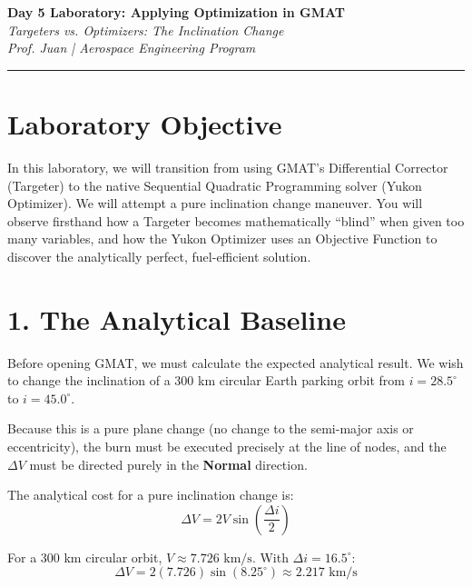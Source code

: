 \documentclass[11pt, letterpaper]{article}
\begin{document}
\begin{center}
    {\Large \textbf{Day 5 Laboratory: Applying Optimization in GMAT}} \\
    \vspace{0.2cm}
    {\large \textit{Targeters vs. Optimizers: The Inclination Change}} \\
    \vspace{0.4cm}
    \textit{Prof. Juan | Aerospace Engineering Program}
\end{center}
\hrule
\vspace{0.5cm}

\section*{Laboratory Objective}
In this laboratory, we will transition from using GMAT's Differential Corrector (Targeter) to the native Sequential Quadratic Programming solver (Yukon Optimizer). We will attempt a pure inclination change maneuver. You will observe firsthand how a Targeter becomes mathematically ``blind'' when given too many variables, and how the Yukon Optimizer uses an Objective Function to discover the analytically perfect, fuel-efficient solution.

\section*{1. The Analytical Baseline}
Before opening GMAT, we must calculate the expected analytical result. We wish to change the inclination of a 300 km circular Earth parking orbit from $i = 28.5^\circ$ to $i = 45.0^\circ$. 

Because this is a pure plane change (no change to the semi-major axis or eccentricity), the burn must be executed precisely at the line of nodes, and the $\Delta V$ must be directed purely in the \textbf{Normal} direction. 

The analytical cost for a pure inclination change is:
\begin{equation}
    \Delta V = 2 V \sin \left( \frac{\Delta i}{2} \right)
\end{equation}

For a 300 km circular orbit, $V \approx 7.726 \text{ km/s}$. With $\Delta i = 16.5^\circ$:
\begin{equation}
    \Delta V = 2 (7.726) \sin(8.25^\circ) \approx 2.217 \text{ km/s}
\end{equation}
\end{document}
